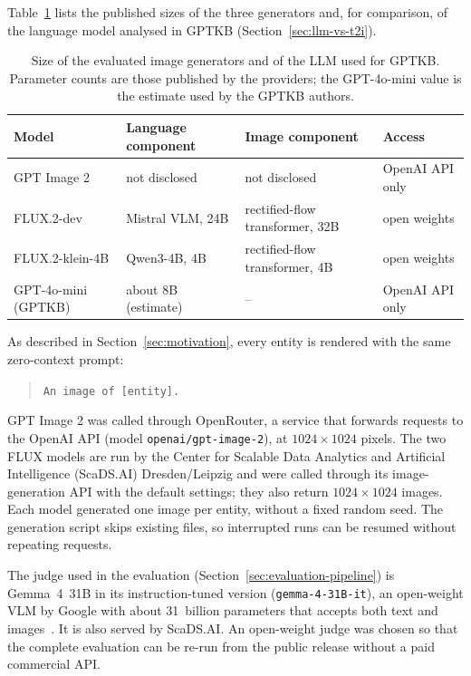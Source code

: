 Table~\ref{tab:model-sizes} lists the published sizes of the three generators
and, for comparison, of the language model analysed in GPTKB
(Section~\ref{sec:llm-vs-t2i}).

\begin{table}[ht]
\centering
\footnotesize
\caption{Size of the evaluated image generators and of the LLM used for GPTKB.
Parameter counts are those published by the providers; the GPT-4o-mini value is
the estimate used by the GPTKB authors.}
\label{tab:model-sizes}
\begin{tabular}{llll}
\toprule
Model & Language component & Image component & Access \\
\midrule
GPT Image 2 & not disclosed & not disclosed & OpenAI API only \\
FLUX.2-dev & Mistral VLM, 24B & rectified-flow transformer, 32B & open weights \\
FLUX.2-klein-4B & Qwen3-4B, 4B & rectified-flow transformer, 4B & open weights \\
\midrule
GPT-4o-mini (GPTKB) & about 8B (estimate) & -- & OpenAI API only \\
\bottomrule
\end{tabular}
\end{table}

As described in Section~\ref{sec:motivation}, every entity is rendered with the
same zero-context prompt:

\begin{quote}
\texttt{An image of [entity].}
\end{quote}

GPT Image 2 was called through OpenRouter, a service that forwards requests to
the OpenAI API (model \texttt{openai/gpt-image-2}), at $1024\times1024$ pixels.
The two FLUX models are run by the Center for Scalable Data Analytics and
Artificial Intelligence (ScaDS.AI) Dresden/Leipzig and were called through its
image-generation API with the default settings; they also return
$1024\times1024$ images. Each model generated one image per entity, without a
fixed random seed. The generation script skips existing files, so interrupted
runs can be resumed without repeating requests.

The judge used in the evaluation (Section~\ref{sec:evaluation-pipeline}) is
Gemma~4~31B in its instruction-tuned version (\texttt{gemma-4-31B-it}), an
open-weight VLM by Google with about 31~billion parameters that accepts both
text and images~\citep{gemma4}. It is also served by ScaDS.AI. An open-weight
judge was chosen so that the complete evaluation can be re-run from the public
release without a paid commercial API.


